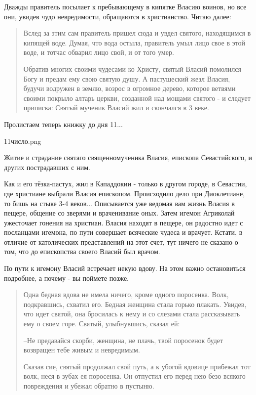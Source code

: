 \documentclass[a5paper,11pt,openany]{article}
\begin{document}
Дважды правитель посылает к пребывающему в кипятке Власию воинов, но все они, увидев чудо невредимости, обращаются в христианство. Читаю далее:

\begin{quotation}
\noindent Вслед за этим сам правитель пришел сюда и увдел святого, находящимся в кипящей воде. Думая, что вода остыла, правитель умыл лицо свое в этой воде, и тотчас обварил лицо свой, и от того умер.

   Обратив многих своими чудесами ко Христу, святый Власий помолился Богу и предам ему свою святую душу. А пастушеский жезл Власия, будучи водружен в землю, возрос в огромное дерево, которое ветвями своими покрыло алтарь церкви, созданной над мощами святого - и следует приписка: Святый мученик Власий жил и скончался в 3 веке.
\end{quotation}

Пролистаем теперь книжку до дня 11...

11число.png

Житие и страдание святаго священномученика Власия, епископа Севастийского, и других пострадавших с ним.

   Как и его тёзка-пастух, жил в Кападдокии - только в другом городе, в Севастии, где христиане выбрали Власия епископом. Происходило дело при Диоклетиане, то бишь на стыке 3-4 веков... Описывается уже ведомая вам жизнь Власия в пещере, общение со зверями и враченивание оных. Затем игемон Агриколай ужесточает гонения на христиан. Власия находят в пещере, он радостно идет с посланцами игемона, по пути совершает всяческие чудеса и врачует. Кстати, в отличие от католических представлений на этот счет, тут ничего не сказано о том, что до епископства своего Власий был врачом. 

   По пути к игемону Власий встречает некую вдову. На этом важно остановиться подробнее, а почему - вы поймете позже.

\begin{quotation}
\noindent Одна бедная вдова не имела ничего, кроме одного поросенка. Волк, подкравшись, схватил его. Бедная женщина стала горько плакать. Увидев, что идет святой, она бросилась к нему и со слезами стала рассказывать ему о своем горе. Святый, улыбнувшись, сказал ей:

--Не предавайся скорби, женщина, не плачь, твой поросенок будет возвращен тебе живым и невредимым.

   Сказав сие, святый продолжал свой путь, а к убогой вдовице прибежал тот волк, неся в зубах ея поросенка. Он отпустил его перед нею безо всякого повреждения и убежал обратно в пустыню.\end{quotation}
\end{document}
